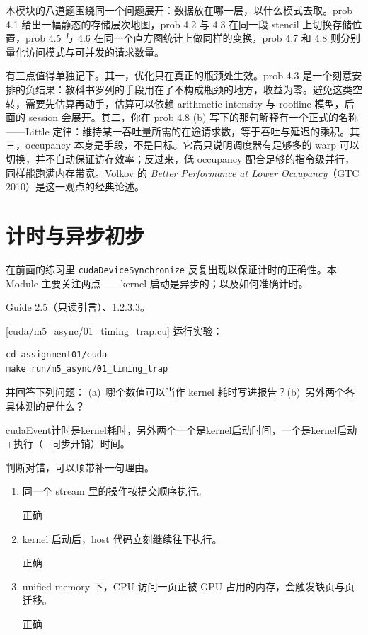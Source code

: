 \documentclass[11pt,a4paper,fontset=none]{ctexart}
\begin{document}
\begin{lookback}
本模块的八道题围绕同一个问题展开：数据放在哪一层，以什么模式去取。prob 4.1 给出一幅静态的存储层次地图，prob 4.2 与 4.3 在同一段 stencil 上切换存储位置，prob 4.5 与 4.6 在同一个直方图统计上做同样的变换，prob 4.7 和 4.8 则分别量化访问模式与可并发的请求数量。

有三点值得单独记下。其一，优化只在真正的瓶颈处生效。prob 4.3 是一个刻意安排的负结果：教科书罗列的手段用在了不构成瓶颈的地方，收益为零。避免这类空转，需要先估算再动手，估算可以依赖 arithmetic intensity 与 roofline 模型，后面的 session 会展开。其二，你在 prob 4.8 (b) 写下的那句解释有一个正式的名称——Little 定律：维持某一吞吐量所需的在途请求数，等于吞吐与延迟的乘积。其三，occupancy 本身是手段，不是目标。它高只说明调度器有足够多的 warp 可以切换，并不自动保证访存效率；反过来，低 occupancy 配合足够的指令级并行，同样能跑满内存带宽。Volkov 的 \textit{Better Performance at Lower Occupancy}（GTC 2010）是这一观点的经典论述。
\end{lookback}

\section{计时与异步初步}

在前面的练习里 \texttt{cudaDeviceSynchronize} 反复出现以保证计时的正确性。本 Module 主要关注两点——kernel 启动是异步的；以及如何准确计时。

\begin{reading}
Guide 2.5（只读引言）、1.2.3.3。
\end{reading}

[cuda/m5\_async/01\_timing\_trap.cu]
运行实验：

\begin{lstlisting}
cd assignment01/cuda
make run/m5_async/01_timing_trap
\end{lstlisting}

并回答下列问题：
(a)~哪个数值可以当作 kernel 耗时写进报告？(b)~另外两个各具体测的是什么？

cudaEvent计时是kernel耗时，另外两个一个是kernel启动时间，一个是kernel启动+执行（+同步开销）时间。

判断对错，可以顺带补一句理由。
\begin{enumerate}[label=(\alph*)]
  \item 同一个 stream 里的操作按提交顺序执行。

  正确

  \item kernel 启动后，host 代码立刻继续往下执行。

  正确

  \item unified memory 下，CPU 访问一页正被 GPU 占用的内存，会触发缺页与页迁移。

  正确
\end{enumerate}
\end{document}
